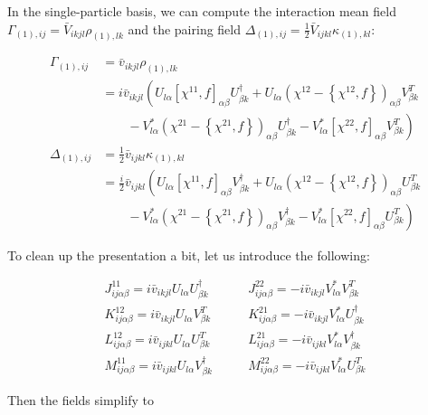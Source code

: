 In the single-particle basis, we can compute the interaction mean field $\Gamma_{(1),ij} = \bar{V}_{ikjl}\rho_{(1),lk}$ and the pairing field $\Delta_{(1),ij} = \frac{1}{2}\bar{V}_{ijkl}\kappa_{(1),kl}$:

\begin{align}
\Gamma_{(1),ij} 
&= \bar{v}_{ikjl}\rho_{(1),lk} \\
&= i\bar{v}_{ikjl}\left(U_{l\alpha}[\chi^{11},f]_{\alpha\beta}U^\dagger_{\beta k} + U_{l\alpha}\left(\chi^{12}-\left\{\chi^{12},f\right\}\right)_{\alpha\beta}V^T_{\beta k}\right. \\
&\left.\qquad - V^*_{l\alpha}\left(\chi^{21}-\left\{\chi^{21},f\right\}\right)_{\alpha\beta}U^\dagger_{\beta k} - V^*_{l\alpha}[\chi^{22},f]_{\alpha\beta}V^T_{\beta k} \right) \\
\Delta_{(1),ij} 
&= \frac{1}{2}\bar{v}_{ijkl}\kappa_{(1),kl} \\
&= \frac{i}{2}\bar{v}_{ijkl}\left(U_{l\alpha}[\chi^{11},f]_{\alpha\beta}V^\dagger_{\beta k} + U_{l\alpha}\left(\chi^{12}-\left\{\chi^{12},f\right\}\right)_{\alpha\beta}U^T_{\beta k}\right. \\
&\left.\qquad - V^*_{l\alpha}\left(\chi^{21}-\left\{\chi^{21},f\right\}\right)_{\alpha\beta}V^\dagger_{\beta k} - V^*_{l\alpha}[\chi^{22},f]_{\alpha\beta}U^T_{\beta k} \right)
\end{align}

To clean up the presentation a bit, let us introduce the following:

\begin{tcolorbox}
	\begin{align}
	J^{11}_{ij\alpha\beta} = i\bar{v}_{ikjl}U_{l\alpha}U^\dagger_{\beta k} &\qquad J^{22}_{ij\alpha\beta} = -i\bar{v}_{ikjl}V^*_{l\alpha}V^T_{\beta k} \\
	K^{12}_{ij\alpha\beta} = i\bar{v}_{ikjl}U_{l\alpha}V^T_{\beta k} &\qquad K^{21}_{ij\alpha\beta} = -i\bar{v}_{ikjl}V^*_{l\alpha}U^\dagger_{\beta k} \\
	L^{12}_{ij\alpha\beta} = i\bar{v}_{ijkl}U_{l\alpha}U^T_{\beta k} &\qquad L^{21}_{ij\alpha\beta} = -i\bar{v}_{ijkl}V^*_{l\alpha}V^\dagger_{\beta k} \\
	M^{11}_{ij\alpha\beta} = i\bar{v}_{ijkl}U_{l\alpha}V^\dagger_{\beta k} &\qquad M^{22}_{ij\alpha\beta} = -i\bar{v}_{ijkl}V^*_{l\alpha}U^T_{\beta k}
	\end{align}
\end{tcolorbox}

\noindent Then the fields simplify to

